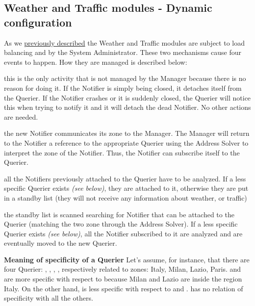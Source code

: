 \subsection{Weather and Traffic modules - Dynamic configuration}
	\label{sect:WeatherTrafficAlgorithm}
	As we \hyperref[sect:WeatherTrafficModules]{previously described} the Weather and Traffic modules are subject to load balancing and  by the System Administrator. These two mechanisms cause four events to happen. How they are managed is described below:
	\begin{description}[before={\renewcommand{\makelabel}[1]{-- \textit{##1}:}}]
		\item[a Notifier is deleted] this is the only activity that is not managed by the Manager because there is no reason for doing it. If the Notifier is simply being closed, it detaches itself from the Querier. If the Notifier crashes or it is suddenly closed, the Querier will notice this when trying to notify it and it will detach the dead Notifier. No other actions are needed.
		\item[a Notifier is created] the new Notifier communicates its zone to the Manager. The Manager will return to the Notifier a reference to the appropriate Querier using the Address Solver to interpret the zone of the Notifier. Thus, the Notifier can subscribe itself to the Querier.
		\item[Quierier is deleted] all the Notifiers previously attached to the Querier have to be analyzed. If a less specific Querier exists \textit{(see below)}, they are attached to it, otherwise they are put in a standby list (they will not receive any information about weather, or traffic)
		\item[a new Querier is instantiated] the standby list is scanned searching for Notifier that can be attached to the Querier (matching the two zone through the Address Solver). If a less specific Querier exists \textit{(see below)}, all the Notifier subscribed to it are analyzed and are eventually moved to the new Querier.
	\end{description}
	\medskip
	\textbf{Meaning of specificity of a Querier}\newline
	Let's assume, for instance, that there are four Querier: , , , , respectively related to zones: Italy, Milan, Lazio, Paris.  and  are more specific with respect to  because Milan and Lazio are inside the region Italy. On the other hand,  is less specific with respect to  and .  has no relation of specificity with all the others.\newline
